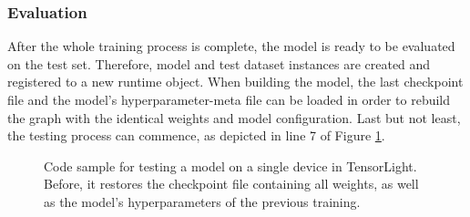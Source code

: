 \subsubsection*{Evaluation}

After the whole training process is complete, the model is ready to be evaluated on the test set. Therefore, model and test dataset instances are created and registered to a new runtime object. When building the model, the last checkpoint file and the model's hyperparameter-meta file can be loaded in order to rebuild the graph with the identical weights and model configuration. Last but not least, the testing process can commence, as depicted in line 7 of Figure \ref{code:runtime_eval}.

\begin{figure}[htpb]
  
  \caption[Code: Evaluation with TensorLight]{Code sample for testing a model on a single device in TensorLight. Before, it restores the checkpoint file containing all weights, as well as the model's hyperparameters of the previous training.}\label{code:runtime_eval}
\end{figure}
